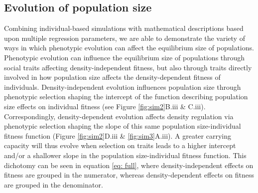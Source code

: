 \documentclass{article}
\begin{document}
\subsection{Evolution of population size}
Combining individual-based simulations with mathematical descriptions based upon multiple regression parameters, we are able to demonstrate the variety of ways in which phenotypic evolution can affect the equilibrium size of populations. Phenotypic evolution can influence the equilibrium size of populations through social traits affecting density-independent fitness, but also through traits directly involved in how population size affects the density-dependent fitness of individuals. Density-independent evolution influences population size through phenotypic selection shaping the intercept of the function describing population size effects on individual fitness (see Figure \ref{fig:sim2}B.iii \& C.iii). Correspondingly, density-dependent evolution affects density regulation via phenotypic selection shaping the slope of this same population size-individual fitness function (Figure \ref{fig:sim2}D.iii \& \ref{fig:sim3}A.iii). A greater carrying capacity will thus evolve when selection on traits leads to a higher intercept and/or a shallower slope in the population size-individual fitness function. This dichotomy can be seen in equation \ref{eq: full}, where density-independent effects on fitness are grouped in the numerator, whereas density-dependent effects on fitness are grouped in the denominator.
\end{document}
